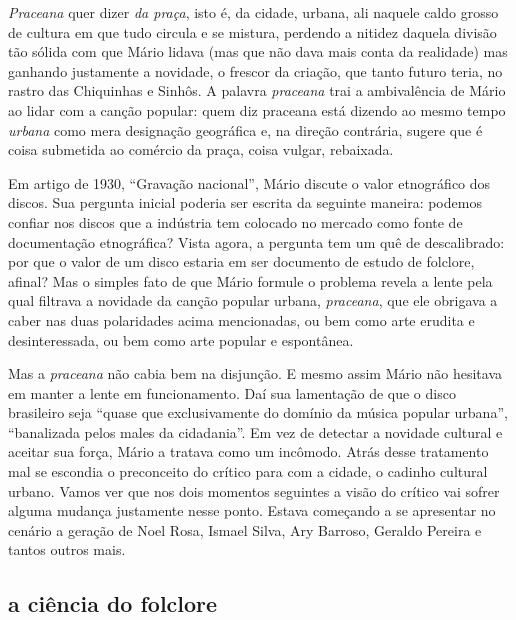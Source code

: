 \textit{Praceana} quer dizer \textit{da praça}, isto é, da cidade, urbana, ali naquele
caldo grosso de cultura em que tudo circula e se mistura, perdendo a
nitidez daquela divisão tão sólida com que Mário lidava (mas que não
dava mais conta da realidade) mas ganhando justamente a novidade, o
frescor da criação, que tanto futuro teria, no rastro das Chiquinhas e
Sinhôs. A palavra \textit{praceana} trai a ambivalência de Mário ao lidar com
a canção popular: quem diz praceana está dizendo ao mesmo tempo
\textit{urbana} como mera designação geográfica e, na direção contrária,
sugere que é coisa submetida ao comércio da praça, coisa vulgar,
rebaixada.

Em artigo de 1930, ``Gravação nacional'', Mário discute o valor
etnográfico dos discos. Sua pergunta inicial poderia ser escrita da
seguinte maneira: podemos confiar nos discos que a indústria tem
colocado no mercado como fonte de documentação etnográfica? Vista agora,
a pergunta tem um quê de descalibrado: por que o valor de um disco
estaria em ser documento de estudo de folclore, afinal? Mas o simples
fato de que Mário formule o problema revela a lente pela qual filtrava a
novidade da canção popular urbana, \textit{praceana}, que ele obrigava a
caber nas duas polaridades acima mencionadas, ou bem como arte erudita e
desinteressada, ou bem como arte popular e espontânea.

Mas a \textit{praceana} não cabia bem na disjunção. E mesmo assim Mário não
hesitava em manter a lente em funcionamento. Daí sua lamentação de que o
disco brasileiro seja ``quase que exclusivamente do domínio da música
popular urbana'', ``banalizada pelos males da cidadania''. Em vez de
detectar a novidade cultural e aceitar sua força, Mário a tratava como
um incômodo. Atrás desse tratamento mal se escondia o preconceito do
crítico para com a cidade, o cadinho cultural urbano. Vamos ver que nos
dois momentos seguintes a visão do crítico vai sofrer alguma mudança
justamente nesse ponto. Estava começando a se apresentar no cenário a
geração de Noel Rosa, Ismael Silva, Ary Barroso, Geraldo Pereira e
tantos outros mais.

\subsection{a ciência do folclore}

